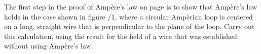 The first step in the proof of Amp\`{e}re's law on page \pageref{ampereproof}
        is to show that Amp\`{e}re's law holds in the case shown in figure
        /1, where a circular Amp\`{e}rian loop is
        centered on a long, straight wire that is perpendicular to the plane
        of the loop. Carry out this calculation, using the result 
        for the field of a wire that was established without using Amp\`{e}re's law.
